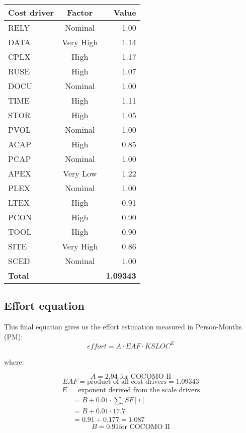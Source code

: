\documentclass{scrreprt}
\begin{document}
\begin{center}
\begin{tabular}{lcr}
\toprule \textbf{Cost driver}&\textbf{Factor}&\textbf{Value}\\ \midrule
RELY & Nominal & 1.00\\ 
DATA & Very High & 1.14\\ 
CPLX & High & 1.17\\ 
RUSE & High & 1.07\\ 
DOCU & Nominal & 1.00\\ 
TIME & High & 1.11\\ 
STOR & High & 1.05\\ 
PVOL & Nominal & 1.00\\ 
ACAP & High & 0.85\\ 
PCAP & Nominal & 1.00\\ 
APEX & Very Low & 1.22\\ 
PLEX & Nominal & 1.00\\ 
LTEX & High & 0.91\\ 
PCON & High & 0.90\\ 
TOOL & High & 0.90\\ 
SITE & Very High & 0.86\\ 
SCED & Nominal & 1.00\\ \midrule
\textbf{Total}&&\textbf{1.09343}\\
\bottomrule
\end{tabular}
\end{center}
	
	
\subsection{Effort equation}
This final equation gives us the effort estimation measured in Person-Months (PM):
\[
	\mathit{effort} = A \cdot \mathit{EAF} \cdot \mathit{KSLOC}^E
\]

where:

\[
	A = 2.94 \text{ for COCOMO II}
\]
\[
	\mathit{EAF} = \text{product of all cost drivers} = 1.09343
\]
\[
\begin{split}
	E &= \text{exponent derived from the scale drivers} \\
	&= B + 0.01 \cdot \sum_{i} SF[i] \\
	&= B + 0.01 \cdot 17.7 \\
	&= 0.91 + 0.177 = 1.087
\end{split}
\]
\[
	B = 0.91 \text{for COCOMO II}
\]
\end{document}
